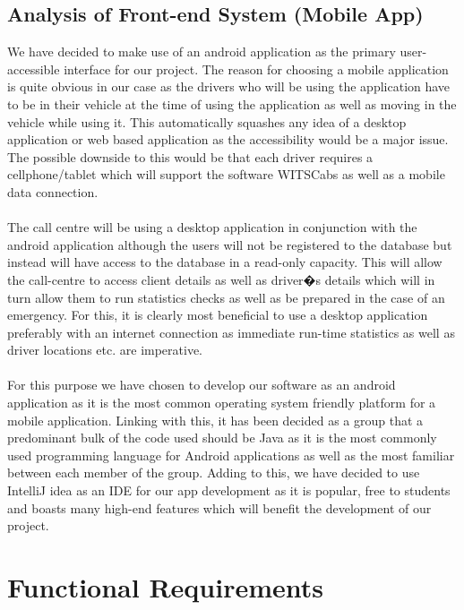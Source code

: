 \documentclass[a4paper,12pt]{article}
\begin{document}
\subsection{Analysis of Front-end System (Mobile App)}
We have decided to make use of an android application as the primary user-accessible interface for our project. The reason for choosing a mobile application is quite obvious in our case as the drivers who will be using the application have to be in their vehicle at the time of using the application as well as moving in the vehicle while using it. This automatically squashes any idea of a desktop application or web based application as the accessibility would be a major issue. The possible downside to this would be that each driver requires a cellphone/tablet which will support the software WITSCabs as well as a mobile data connection. \\\\
The call centre will be using a desktop application in conjunction with the android application although the users will not be registered to the database but instead will have access to the database in a read-only capacity. This will allow the call-centre to access client details as well as driver�s details which will in turn allow them to run statistics checks as well as be prepared in the case of an emergency. For this, it is clearly most beneficial to use a desktop application preferably with an internet connection as immediate run-time statistics as well as driver locations etc. are imperative.\\\\
For this purpose we have chosen to develop our software as an android application as it is the most common operating system friendly platform for a mobile application. Linking with this, it has been decided as a group that a predominant bulk of the code used should be Java as it is the most commonly used programming language for Android applications as well as the most familiar between each member of the group. Adding to this, we have decided to use IntelliJ idea as an IDE for our app development as it is popular, free to students and boasts many high-end features which will benefit the development of our project.

\section{Functional Requirements}
\end{document}
